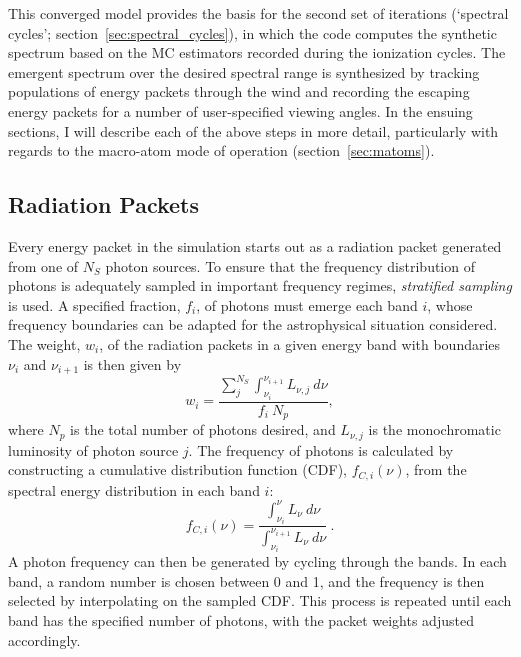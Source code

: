 This converged model provides the basis for the second set of
iterations (`spectral cycles'; section~\ref{sec:spectral_cycles}), 
in which the code computes the synthetic spectrum based on the 
MC estimators recorded during the ionization cycles. 
The emergent spectrum over the desired spectral range is synthesized by 
tracking populations of energy packets through the wind and recording 
the escaping energy packets for 
a number of user-specified viewing angles.  In the ensuing sections,
I will describe each of the above steps in more detail, particularly
with regards to the macro-atom mode of operation (section~\ref{sec:matoms}).


\subsection{Radiation Packets}
\label{sec:packets} 
Every energy packet in the simulation starts out as a radiation packet generated
from one of $N_S$ photon sources. To ensure that the frequency distribution
of photons is adequately sampled in important frequency regimes, 
{\em stratified sampling} is used. A specified fraction, $f_i$,
of photons must emerge each band $i$, whose frequency boundaries
can be adapted for the astrophysical situation considered. 
The weight, $w_i$, of the radiation packets in a given energy band with boundaries
$\nu_i$ and $\nu_{i+1}$ is then given by
\begin{equation}
w_i = \frac{\sum_j^{N_S} \int_{\nu_i}^{\nu_{i+1}} L_{\nu,j}~d\nu}{f_i~N_p},
\end{equation}
where $N_p$ is the total number of photons desired, 
and $L_{\nu,j}$ is the monochromatic 
luminosity of photon source $j$. 
The frequency of photons is calculated by constructing a 
cumulative distribution function (CDF), $f_{C,i}(\nu)$,
from the spectral energy distribution in each band $i$: 
\begin{equation}
f_{C,i} (\nu) = 
\frac{\int_{\nu_i}^{\nu} L_\nu~d\nu}
{\int_{\nu_i}^{\nu_{i+1}} L_\nu~d\nu} ~.
\end{equation}
A photon frequency can then be generated by cycling through the bands. In each band,
a random number is chosen between 0 and 1, and the frequency is 
then selected by interpolating on the sampled CDF. This process is repeated until 
each band has the specified number of photons, with the packet
weights adjusted accordingly.


